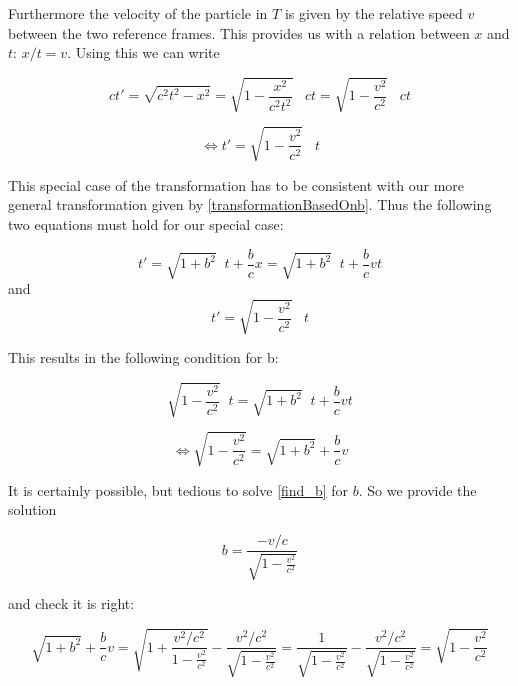 \documentclass{article}
\begin{document}
Furthermore the velocity of the particle in $T$ is given by the relative speed $v$ between the two reference frames.
This provides us with a relation between $x$ and $t$: $x/t=v$. Using this we can write

\begin{equation}
ct' = \sqrt{c^2 t^2 - x^2} = \sqrt{1 - \frac{x^2}{c^2t^2}} \; \; \; ct = \sqrt{1 - \frac{v^2}{c^2}} \; \; \; ct
\end{equation}

\begin{equation} \label{timeDilation}
\iff t' = \sqrt{1 - \frac{v^2}{c^2}} \; \; \; t
\end{equation}

This special case of the transformation has to be consistent with our more general transformation given by \ref{transformationBasedOnb}.
Thus the following two equations must hold for our special case:

\begin{equation}
t' = \sqrt{1+b^2} \; \; t + \frac{b}{c} x = \sqrt{1+b^2} \; \; t + \frac{b}{c} v t
\end{equation}
and
\begin{equation}
t' = \sqrt{1 - \frac{v^2}{c^2}} \; \; \; t
\end{equation}

This results in the following condition for b:


\begin{equation}
\sqrt{1 - \frac{v^2}{c^2}} \; \; t = \sqrt{1+b^2} \; \; t + \frac{b}{c} v t
\end{equation}

\begin{equation} \label{find_b}
\iff \sqrt{1 - \frac{v^2}{c^2}} = \sqrt{1+b^2} + \frac{b}{c} v
\end{equation}


It is certainly possible, but tedious to solve \ref{find_b} for $b$. So we provide the solution

\begin{equation}
b = \frac{-v/c}{\sqrt{1 - \frac{v^2}{c^2}}}
\end{equation}

and check it is right:

\begin{equation}
\sqrt{1+b^2} + \frac{b}{c} v
= \sqrt{1+\frac{v^2/c^2}{1 - \frac{v^2}{c^2}}} - \frac{v^2/c^2}{\sqrt{1 - \frac{v^2}{c^2}}}
= \frac{1}{\sqrt{1 - \frac{v^2}{c^2}}}  - \frac{v^2/c^2}{\sqrt{1 - \frac{v^2}{c^2}}}
=  \sqrt{1 - \frac{v^2}{c^2}}
\end{equation}
\end{document}
